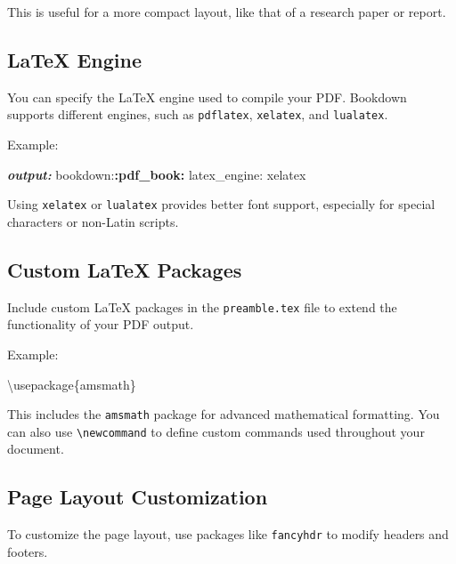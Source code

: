 \documentclass[
]{book}
\newenvironment{Shaded}{\begin{snugshade}}{\end{snugshade}}
\newcommand{\AnnotationTok}[1]{\textcolor[rgb]{0.56,0.35,0.01}{\textbf{\textit{#1}}}}
\newcommand{\BuiltInTok}[1]{#1}
\newcommand{\ExtensionTok}[1]{#1}
\newcommand{\NormalTok}[1]{#1}
\newcommand{\SpecialCharTok}[1]{\textcolor[rgb]{0.81,0.36,0.00}{\textbf{#1}}}
\theoremstyle{definition}
\theoremstyle{definition}
\theoremstyle{definition}
\theoremstyle{definition}
\theoremstyle{remark}
\begin{document}
This is useful for a more compact layout, like that of a research paper or report.

\subsection{LaTeX Engine}\label{latex-engine}

You can specify the LaTeX engine used to compile your PDF. Bookdown supports different engines, such as \texttt{pdflatex}, \texttt{xelatex}, and \texttt{lualatex}.

Example:

\begin{Shaded}
\begin{Highlighting}[]
\AnnotationTok{output:}
\NormalTok{  bookdown:}\SpecialCharTok{:pdf\_book:}
\NormalTok{    latex\_engine: xelatex}
\end{Highlighting}
\end{Shaded}

Using \texttt{xelatex} or \texttt{lualatex} provides better font support, especially for special characters or non-Latin scripts.

\subsection{Custom LaTeX Packages}\label{custom-latex-packages}

Include custom LaTeX packages in the \texttt{preamble.tex} file to extend the functionality of your PDF output.

Example:

\begin{Shaded}
\begin{Highlighting}[]
\BuiltInTok{\textbackslash{}usepackage}\NormalTok{\{}\ExtensionTok{amsmath}\NormalTok{\}}
\end{Highlighting}
\end{Shaded}

This includes the \texttt{amsmath} package for advanced mathematical formatting. You can also use \texttt{\textbackslash{}newcommand} to define custom commands used throughout your document.

\subsection{Page Layout Customization}\label{page-layout-customization}

To customize the page layout, use packages like \texttt{fancyhdr} to modify headers and footers.
\end{document}
